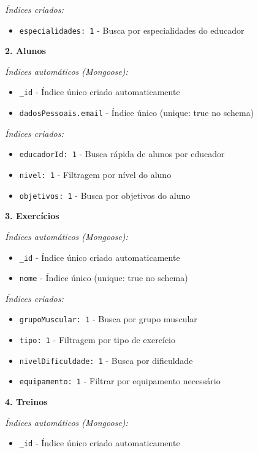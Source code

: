 \documentclass[12pt,a4paper]{article}
\begin{document}
\textit{Índices criados:}
\begin{itemize}
    \item \texttt{especialidades: 1} - Busca por especialidades do educador
\end{itemize}

\textbf{2. Alunos}

\textit{Índices automáticos (Mongoose):}
\begin{itemize}
    \item \texttt{\_id} - Índice único criado automaticamente
    \item \texttt{dadosPessoais.email} - Índice único (unique: true no schema)
\end{itemize}

\textit{Índices criados:}
\begin{itemize}
    \item \texttt{educadorId: 1} - Busca rápida de alunos por educador
    \item \texttt{nivel: 1} - Filtragem por nível do aluno
    \item \texttt{objetivos: 1} - Busca por objetivos do aluno
\end{itemize}

\textbf{3. Exercícios}

\textit{Índices automáticos (Mongoose):}
\begin{itemize}
    \item \texttt{\_id} - Índice único criado automaticamente
    \item \texttt{nome} - Índice único (unique: true no schema)
\end{itemize}

\textit{Índices criados:}
\begin{itemize}
    \item \texttt{grupoMuscular: 1} - Busca por grupo muscular
    \item \texttt{tipo: 1} - Filtragem por tipo de exercício
    \item \texttt{nivelDificuldade: 1} - Busca por dificuldade
    \item \texttt{equipamento: 1} - Filtrar por equipamento necessário
\end{itemize}

\textbf{4. Treinos}

\textit{Índices automáticos (Mongoose):}
\begin{itemize}
    \item \texttt{\_id} - Índice único criado automaticamente
\end{itemize}
\end{document}
